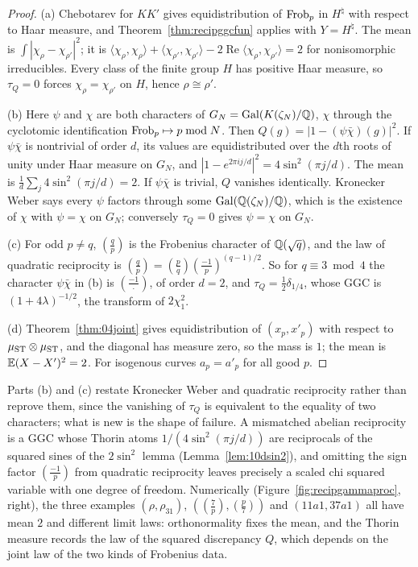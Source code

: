 \begin{proof}
(a) Chebotarev for $KK'$ gives equidistribution of $\operatorname{Frob}_p$ in $H^\natural$ with respect to Haar measure, and Theorem~\ref{thm:recipggcfun} applies with $Y=H^\natural$. The mean is $\int|\chi_\rho-\chi_{\rho'}|^2$; it is $\langle\chi_\rho,\chi_\rho\rangle+\langle\chi_{\rho'},\chi_{\rho'}\rangle-2\operatorname{Re}\langle\chi_\rho,\chi_{\rho'}\rangle=2$ for nonisomorphic irreducibles. Every class of the finite group $H$ has positive Haar measure, so $\tau_Q=0$ forces $\chi_\rho=\chi_{\rho'}$ on $H$, hence $\rho\cong\rho'$.

(b) Here $\psi$ and $\chi$ are both characters of $G_N=\operatorname{Gal}(K(\zeta_N)/\mathbb{Q})$, $\chi$ through the cyclotomic identification $\operatorname{Frob}_p\mapsto p\bmod N$. Then $Q(g)=|1-(\psi\bar\chi)(g)|^2$. If $\psi\bar\chi$ is nontrivial of order $d$, its values are equidistributed over the $d$th roots of unity under Haar measure on $G_N$, and $|1-e^{2\pi ij/d}|^2=4\sin^2(\pi j/d)$. The mean is $\frac1d\sum_j4\sin^2(\pi j/d)=2$. If $\psi\bar\chi$ is trivial, $Q$ vanishes identically. Kronecker Weber says every $\psi$ factors through some $\operatorname{Gal}(\mathbb{Q}(\zeta_N)/\mathbb{Q})$, which is the existence of $\chi$ with $\psi=\chi$ on $G_N$; conversely $\tau_Q=0$ gives $\psi=\chi$ on $G_N$.

(c) For odd $p\ne q$, $(\frac qp)$ is the Frobenius character of $\mathbb{Q}(\sqrt q)$, and the law of quadratic reciprocity is $(\frac qp)=(\frac pq)(\frac{-1}p)^{(q-1)/2}$. So for $q\equiv3\bmod4$ the character $\psi\bar\chi$ in (b) is $(\frac{-1}{\cdot})$, of order $d=2$, and $\tau_Q=\frac12\delta_{1/4}$, whose GGC is $(1+4\lambda)^{-1/2}$, the transform of $2\chi^2_1$.

(d) Theorem~\ref{thm:04joint} gives equidistribution of $(x_p,x'_p)$ with respect to $\mu_{\mathrm{ST}}\otimes\mu_{\mathrm{ST}}$, and the diagonal has measure zero, so the mass is $1$; the mean is $\mathbb{E}(X-X')^2=2$. For isogenous curves $a_p=a'_p$ for all good $p$.
\end{proof}

Parts (b) and (c) restate Kronecker Weber and quadratic reciprocity rather than reprove them, since the vanishing of $\tau_Q$ is equivalent to the equality of two characters; what is new is the shape of failure. A mismatched abelian reciprocity is a GGC whose Thorin atoms $1/(4\sin^2(\pi j/d))$ are reciprocals of the squared sines of the $2\sin^2$ lemma (Lemma~\ref{lem:10dsin2}), and omitting the sign factor $(\frac{-1}p)$ from quadratic reciprocity leaves precisely a scaled chi squared variable with one degree of freedom. Numerically (Figure~\ref{fig:recipgammaproc}, right), the three examples $(\rho,\rho_{31})$, $((\frac7p),(\frac p7))$ and $(11a1,37a1)$ all have mean $2$ and different limit laws: orthonormality fixes the mean, and the Thorin measure records the law of the squared discrepancy $Q$, which depends on the joint law of the two kinds of Frobenius data.

